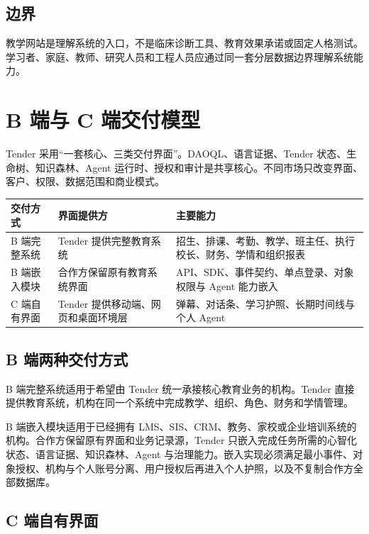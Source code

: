\documentclass[UTF8,a4paper,11pt]{ctexart}
\begin{document}
\subsection{边界}

教学网站是理解系统的入口，不是临床诊断工具、教育效果承诺或固定人格测试。学习者、家庭、教师、研究人员和工程人员应通过同一套分层数据边界理解系统能力。


\section{B 端与 C 端交付模型}

Tender 采用“一套核心、三类交付界面”。DAOQL、语言证据、Tender 状态、生命树、知识森林、Agent 运行时、授权和审计是共享核心。不同市场只改变界面、客户、权限、数据范围和商业模式。

\begin{center}
\begin{longtable}{@{}p{3.2cm}p{4.8cm}p{4.6cm}@{}}
\toprule
\textbf{交付方式} & \textbf{界面提供方} & \textbf{主要能力} \\
\midrule
B 端完整系统 & Tender 提供完整教育系统 & 招生、排课、考勤、教学、班主任、执行校长、财务、学情和组织报表 \\
B 端嵌入模块 & 合作方保留原有教育系统界面 & API、SDK、事件契约、单点登录、对象权限与 Agent 能力嵌入 \\
C 端自有界面 & Tender 提供移动端、网页和桌面环境层 & 弹幕、对话条、学习护照、长期时间线与个人 Agent \\
\bottomrule
\end{longtable}
\end{center}

\subsection{B 端两种交付方式}

B 端完整系统适用于希望由 Tender 统一承接核心教育业务的机构。Tender 直接提供教育系统，机构在同一个系统中完成教学、组织、角色、财务和学情管理。

B 端嵌入模块适用于已经拥有 LMS、SIS、CRM、教务、家校或企业培训系统的机构。合作方保留原有界面和业务记录源，Tender 只嵌入完成任务所需的心智化状态、语言证据、知识森林、Agent 与治理能力。嵌入实现必须满足最小事件、对象授权、机构与个人账号分离、用户授权后再进入个人护照，以及不复制合作方全部数据库。

\subsection{C 端自有界面}
\end{document}
